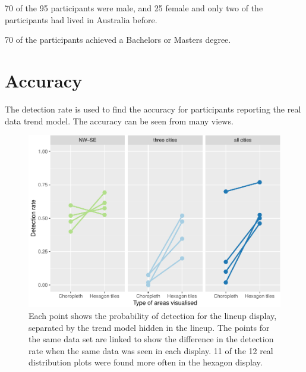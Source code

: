 \documentclass[conference,final,]{IEEEtran}
\makeatletter
\def\maxwidth{\ifdim\Gin@nat@width>\linewidth\linewidth
\else\Gin@nat@width\fi}
\let\Oldincludegraphics\includegraphics
\renewcommand{\includegraphics}[1]{\Oldincludegraphics[width=\maxwidth]{#1}}
\makeatother
\begin{document}
70 of the 95 participants were male, and 25 female and only two of the
participants had lived in Australia before.

70 of the participants achieved a Bachelors or Masters degree.

\hypertarget{accuracy}{%
\section{Accuracy}\label{accuracy}}

The detection rate is used to find the accuracy for participants
reporting the real data trend model. The accuracy can be seen from many
views.

\begin{figure}
\centering
\includegraphics{paper_files/figure-latex/detection_compare-1.pdf}
\caption{Each point shows the probability of detection for the lineup
display, separated by the trend model hidden in the lineup. The points
for the same data set are linked to show the difference in the detection
rate when the same data was seen in each display. 11 of the 12 real
distribution plots were found more often in the hexagon display.}
\end{figure}
\end{document}
